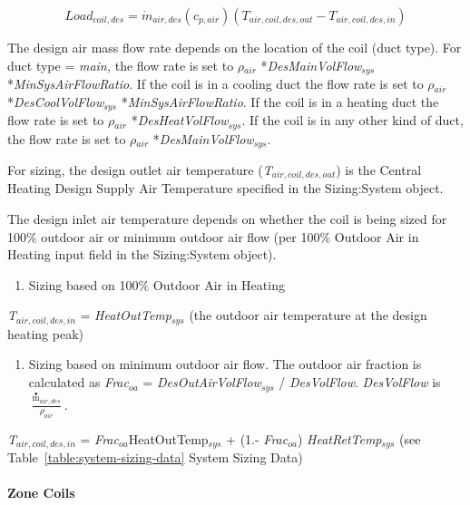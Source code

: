 \begin{equation}
Loa{d_{coil,des}} = {\dot m_{air,des}}({c_{p,air}})({T_{air,coil,des,out}} - {T_{air,coil,des,in}})
\end{equation}

The design air mass flow rate depends on the location of the coil (duct type). For duct type = \emph{main,} the flow rate is set to \emph{\(\rho\)\(_{air}\)} *\emph{DesMainVolFlow\(_{sys}\)} *\emph{MinSysAirFlowRatio}. If the coil is in a cooling duct the flow rate is set to \emph{\(\rho\)\(_{air}\)} *\emph{DesCoolVolFlow\(_{sys}\)} *\emph{MinSysAirFlowRatio}. If the coil is in a heating duct the flow rate is set to \emph{\(\rho\)\(_{air}\)} *\emph{DesHeatVolFlow\(_{sys}\)}. If the coil is in any other kind of duct, the flow rate is set to \emph{\(\rho\)\(_{air}\)} *\emph{DesMainVolFlow\(_{sys}\)}.

For sizing, the design outlet air temperature (\emph{T\(_{air,coil,des,out}\)}) is the Central Heating Design Supply Air Temperature specified in the Sizing:System object.

The design inlet air temperature depends on whether the coil is being sized for 100\% outdoor air or minimum outdoor air flow (per 100\% Outdoor Air in Heating input field in the Sizing:System object).

\begin{enumerate}
\def\labelenumi{\arabic{enumi})}
\tightlist
\item
  Sizing based on 100\% Outdoor Air in Heating
\end{enumerate}

\emph{T\(_{air,coil,des,in}\)} = \emph{HeatOutTemp\(_{sys}\)} (the outdoor air temperature at the design heating peak)

\begin{enumerate}
\def\labelenumi{\arabic{enumi})}
\setcounter{enumi}{1}
\tightlist
\item
  Sizing based on minimum outdoor air flow. The outdoor air fraction is calculated as \emph{Frac}\(_{oa}\) = \emph{DesOutAirVolFlow\(_{sys}\)} / \emph{DesVolFlow}. \emph{DesVolFlow} is \({\frac{{{{\mathop m\limits^ \bullet }_{air,des}}}}{{\rho_{air}}}}\).
\end{enumerate}

\emph{T\(_{air,coil,des,in}\)} = \emph{Frac}\(_{oa}\)HeatOutTemp\(_{sys}\) + (1.- \emph{Frac\(_{oa}\)}) \emph{HeatRetTemp\(_{sys}\)} (see Table~\ref{table:system-sizing-data} System Sizing Data)

\paragraph{Zone Coils}\label{zone-coils-2}

